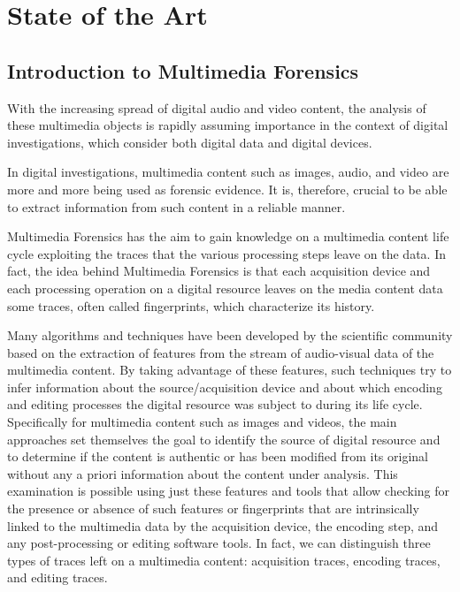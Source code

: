 \chapter{State of the Art}

\section{Introduction to Multimedia Forensics}

With the increasing spread of digital audio and video content, the analysis of these multimedia objects is rapidly assuming importance in the context of digital investigations, which consider both digital data and digital devices.

In digital investigations, multimedia content such as images, audio, and video are more and more being used as forensic evidence. It is, therefore, crucial to be able to extract information from such content in a reliable manner.

Multimedia Forensics has the aim to gain knowledge on a multimedia content life cycle exploiting the traces that the various processing steps leave on the data. In fact, the idea behind Multimedia Forensics is that each acquisition device and each processing operation on a digital resource leaves on the media content data some traces, often called fingerprints, which characterize its history.

Many algorithms and techniques have been developed by the scientific community based on the extraction of features from the stream of audio-visual data of the multimedia content. By taking advantage of these features, such techniques try to infer information about the source/acquisition device and about which encoding and editing processes the digital resource was subject to during its life cycle. Specifically for multimedia content such as images and videos, the main approaches set themselves the goal to identify the source of digital resource and to determine if the content is authentic or has been modified from its original without any a priori information about the content under analysis. This examination is possible using just these features and tools that allow checking for the presence or absence of such features or fingerprints that are intrinsically linked to the multimedia data by the acquisition device, the encoding step, and any post-processing or editing software tools. In fact, we can distinguish three types of traces left on a multimedia content: acquisition traces, encoding traces, and editing traces.


